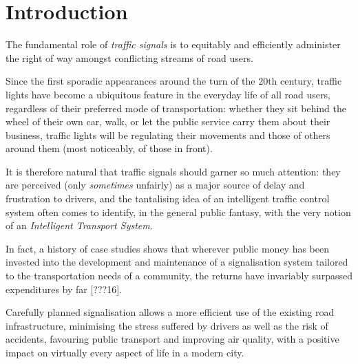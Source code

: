 \chapter*{Introduction}
The fundamental role of \emph{traffic signals} is to equitably and efficiently administer the right of way amongst conflicting streams of road users.

Since the first sporadic appearances around the turn of the 20th century, traffic lights have become a ubiquitous feature in the everyday life of all road users, regardless of their preferred mode of transportation: whether they sit behind the wheel of their own car, walk, or let the public service carry them about their business, traffic lights will be regulating their movements and those of others around them (most noticeably, of those in front).

It is therefore natural that traffic signals should garner so much attention: they are perceived (only \emph{sometimes} unfairly) as a major source of delay and frustration to drivers, and the tantalising idea of an intelligent traffic control system often comes to identify, in the general public fantasy, with the very notion of an \emph{Intelligent Transport System}.

In fact, a history of case studies shows that wherever public money has been invested into the development and maintenance of a signalisation system tailored to the transportation needs of a community, the returns have invariably surpassed expenditures by far [???16].

Carefully planned signalisation allows a more efficient use of the existing road infrastructure,
minimising the stress suffered by drivers as well as the risk of accidents,
favouring public transport and improving air quality, with a positive impact on virtually every aspect of life in a modern city.

